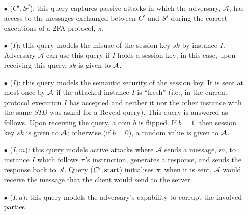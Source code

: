 \begin{itemize}
%
\item [$\bullet$] \execute($C^{i}, S^{j}$): this query captures passive attacks in which the adversary, $\mathcal{A}$, has access to the messages exchanged between $C^{i}$ and $S^{j}$ during the correct executions of a 2FA protocol, $\pi$. 



\item [$\bullet$] \reveal($I$): this query models the misuse of the session key $sk$ by instance $I$.  Adversary $\mathcal{A}$ can use this query if $I$ holds a session key; in this case, upon receiving this query, $sk$ is given to $\mathcal{A}$. 
%



\item [$\bullet$] \test($I$): this query models the semantic security of the session key. It is sent at most once by $\mathcal{A}$ if the attacked instance $I$  is ``fresh'' (i.e., in the current protocol execution $I$ has accepted and neither it nor the other instance with the same $SID$ was asked for a Reveal query). This query is answered as follows. Upon receiving the query, a coin $b$ is flipped. If $b=1$, then session key $sk$ is given to $\mathcal{A}$; otherwise (if $b=0$), a random value is given to $\mathcal{A}$. 



\item [$\bullet$] \send($I, m$):  this query models active attacks where $\mathcal{A}$ sends a message, $m$, to instance $I$ which follows  $\pi$'s instruction, generates a response, and sends the response back to $\mathcal{A}$.  Query  \send($C^{\scriptscriptstyle i}, \text{start}$) initialises $\pi$; when it is sent, $\mathcal{A}$ would receive the message that the client would send to the server. 

%



%
\item [$\bullet$]  \corrupt($I, a$): this query models the adversary's capability to corrupt the involved parties. 




\end{itemize}
